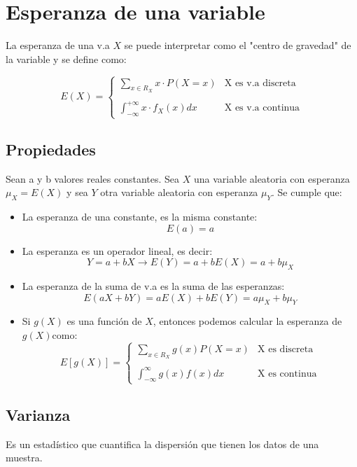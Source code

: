 \documentclass[12pt,twocolumn,a4paper]{report}
\begin{document}
\section*{Esperanza de una variable}
La esperanza de una v.a $X$ se puede interpretar como el "centro de gravedad" de la variable y se define como: 

\begin{equation*}
E(X)= \left\{ \begin{array}{lc}
             \sum_{x\in R_X}x \cdot P(X = x)  & \text{X es v.a discreta} \\
             \\ \int_{-\infty}^{+ \infty}x\cdot f_X(x) dx & \text{X es v.a continua} 
             \end{array}
   \right.
\end{equation*}

\subsection*{Propiedades}
Sean a y b valores reales constantes. Sea $X$ una variable aleatoria con esperanza $\mu_X = E(X)$ y sea $Y$ otra variable aleatoria con esperanza $\mu_Y.$ Se cumple que:
\begin{itemize}
\setlength\itemsep{0.001cm}
\item{La esperanza de una constante, es la misma constante:
$$
E(a) = a
$$}
\item{La esperanza es un operador lineal, es decir:
$$
Y = a + bX \rightarrow E(Y) = a + bE(X) = a + b\mu_X
$$}
\item{La esperanza de la suma de v.a es la suma de las esperanzas:
$$
E(aX + bY) = aE(X) + bE(Y) = a\mu_X + b\mu_Y
$$}
\item{Si $g(X)$ es una función de $X$, entonces podemos calcular la esperanza de $g(X)$como:
\begin{equation*}
E[g(X)]= \left\{ \begin{array}{lc}
            \sum_{x\in R_X} g(x)P(X=x)& \text{X es discreta} \\
             \\ \int_{-\infty}^{\infty}g(x)f(x)dx& \text{X es continua} 
             \end{array}
   \right.
\end{equation*}}
\end{itemize}

\subsection*{Varianza}
Es un estadístico que cuantifica la dispersión que tienen los datos de una muestra.
\end{document}
